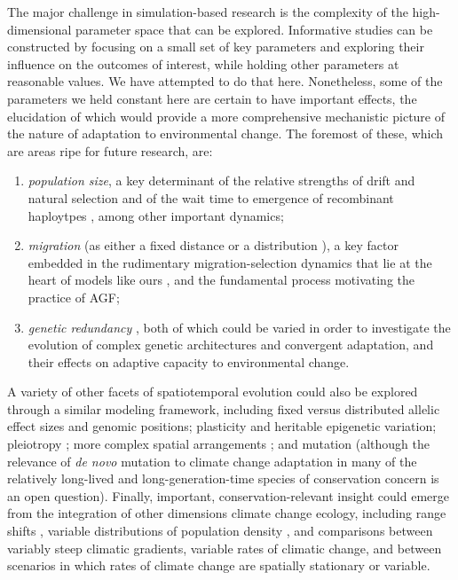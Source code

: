 \documentclass[9pt,twocolumn,twoside,lineno]{pnas-new}
\begin{document}
The major challenge in simulation-based research is the complexity of the high-dimensional 
parameter space that can be explored. Informative studies can be constructed by focusing on a 
small set of key parameters and exploring their influence
on the outcomes of interest, while holding other parameters at reasonable values. We have 
attempted to do that here. Nonetheless, some of the parameters we held constant here are certain 
to have important effects, the elucidation of which would provide a more comprehensive 
mechanistic picture of the nature of adaptation to environmental change. The foremost of these, 
which are areas ripe for future research, are:
    \begin{enumerate}
        \item \textit{population size}, a key determinant of the relative strengths of drift and natural selection \cite{murray} and of the wait time to emergence of recombinant haploytpes \cite{christiansen}, among other important dynamics;
        \item \textit{migration} (as either a fixed distance or a distribution \cite{paulose}), a key factor embedded in the rudimentary migration-selection dynamics that lie at the heart of models like ours \cite{wright,haldane,barton}, and the fundamental process motivating the practice of AGF;
        \item \textit{genetic redundancy} \cite{barghi_redundancy,barghi_polygenic,laruson} , both of which could be varied in order to investigate the evolution of complex genetic architectures and convergent adaptation, and their effects on adaptive capacity to environmental change.
    \end{enumerate}
A variety of other facets of spatiotemporal evolution could also be explored 
through a similar modeling framework, including fixed versus distributed allelic 
effect sizes \cite{orr} and genomic positions; plasticity \cite{chevin} and 
heritable epigenetic variation; pleiotropy \cite{thompson}; more complex spatial 
arrangements \cite{benes}; and mutation (although the relevance of \textit{de 
novo} mutation to climate change adaptation in many of the relatively long-lived 
and long-generation-time species of conservation concern is an open question).
Finally, important, conservation-relevant insight could emerge from the 
integration of other dimensions climate change ecology, including range shifts 
\cite{weiss-lehman}, variable distributions of population density 
\cite{aitken_whitlock}, and comparisons between variably steep climatic 
gradients, variable rates of climatic change, and between scenarios in which 
rates of climate change are spatially stationary or variable. 
\end{document}
